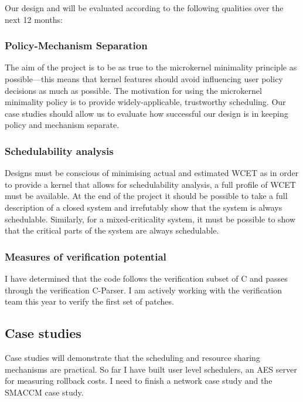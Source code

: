 Our design and will be evaluated according to the following qualities over the next 12 months:

\subsubsection{Policy-Mechanism Separation}

The aim of the project is to be as true to the microkernel minimality principle as possible---this means that kernel features should avoid influencing user policy decisions as much as possible.
The motivation for using the microkernel minimality policy is to provide widely-applicable, trustworthy scheduling.
Our case studies should allow us to evaluate how successful our design is in keeping policy and mechanism separate.

\subsubsection{Schedulability analysis}

Designs must be conscious of minimising actual and estimated \gls{WCET} as in order to provide a kernel that allows for schedulability analysis, a full profile of \gls{WCET} must be available.
At the end of the project it should be possible to take a full description of a closed system and irrefutably show that the system is always schedulable.
Similarly, for a mixed-criticality system, it must be possible to show that the critical parts of the system are always schedulable.

\subsubsection{Measures of verification potential}
I have determined that the code follows the verification subset of C and passes through the verification C-Parser.
I am actively working with the verification team this year to verify the first set of patches. 

\subsection{Case studies}

Case studies will demonstrate that the scheduling and resource sharing mechanisms are practical.
So far I have built user level schedulers, an AES server for measuring rollback costs. 
I need to finish a network case study and the SMACCM case study. 


